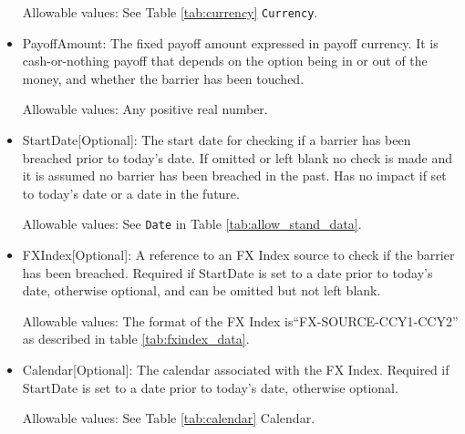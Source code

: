 \begin{itemize}
Allowable values:  See Table \ref{tab:currency} \lstinline!Currency!.

\item PayoffAmount: The fixed payoff amount expressed in payoff currency. It is cash-or-nothing payoff that depends on the option being in or out of the money, and whether the barrier has been touched.

Allowable values:  Any positive real number.

\item StartDate[Optional]: The start date for checking if a barrier has been breached prior to today's date.  If omitted or left blank no check is made and it is assumed no barrier has been breached in the past. Has no impact if set to today's date or a date in the future.

Allowable values:  See \lstinline!Date! in Table \ref{tab:allow_stand_data}.

\item FXIndex[Optional]: A reference to an FX Index source to check if the barrier has been breached. Required if StartDate is set to a date prior to today's date, otherwise optional, and can be omitted but not left blank.

Allowable values:  The format of the FX Index is``FX-SOURCE-CCY1-CCY2'' as described in table \ref{tab:fxindex_data}. 

\item Calendar[Optional]: The calendar associated with the FX Index. Required if StartDate is set to a date prior to today's date, otherwise optional.

Allowable values: See Table \ref{tab:calendar} Calendar.
\end{itemize}

